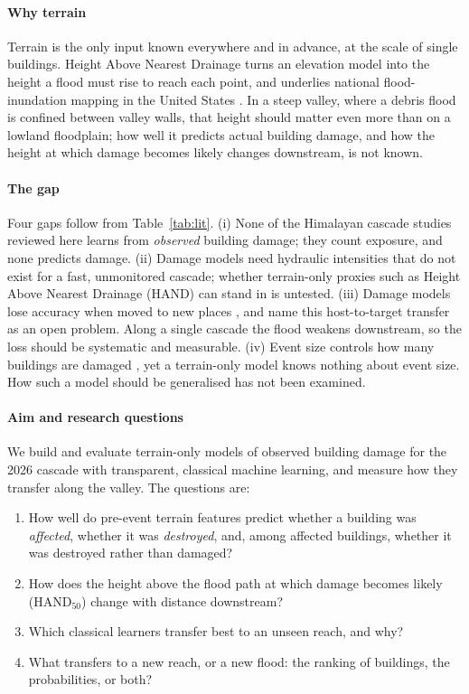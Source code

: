 \documentclass[journal,a4paper]{IEEEtran}
\begin{document}
\paragraph{Why terrain} Terrain is the only input known everywhere and in advance, at the scale of single buildings. Height Above Nearest Drainage turns an elevation model into the height a flood must rise to reach each point, and underlies national flood-inundation mapping in the United States \citep{aristizabal2024}. In a steep valley, where a debris flood is confined between valley walls, that height should matter even more than on a lowland floodplain; how well it predicts actual building damage, and how the height at which damage becomes likely changes downstream, is not known.

\paragraph{The gap} Four gaps follow from Table~\ref{tab:lit}.
(i) None of the Himalayan cascade studies reviewed here learns from \emph{observed} building damage; they count exposure, and none predicts damage.
(ii) Damage models need hydraulic intensities that do not exist for a fast, unmonitored cascade; whether terrain-only proxies such as Height Above Nearest Drainage (HAND) \citep{aristizabal2024} can stand in is untested.
(iii) Damage models lose accuracy when moved to new places \citep{paulik2023,currie2026}, and \citet{ghimire2023} name this host-to-target transfer as an open problem. Along a single cascade the flood weakens downstream, so the loss should be systematic and measurable.
(iv) Event size controls how many buildings are damaged \citep{barnhart2024}, yet a terrain-only model knows nothing about event size. How such a model should be generalised has not been examined.

\paragraph{Aim and research questions} We build and evaluate terrain-only models of observed building damage for the 2026 cascade with transparent, classical machine learning, and measure how they transfer along the valley. The questions are:
\begin{enumerate}[label=\textbf{RQ\arabic*.},leftmargin=2.6em]
  \item How well do pre-event terrain features predict whether a building was \emph{affected}, whether it was \emph{destroyed}, and, among affected buildings, whether it was destroyed rather than damaged?
  \item How does the height above the flood path at which damage becomes likely (HAND$_{50}$) change with distance downstream?
  \item Which classical learners transfer best to an unseen reach, and why?
  \item What transfers to a new reach, or a new flood: the ranking of buildings, the probabilities, or both?
\end{enumerate}
\end{document}
